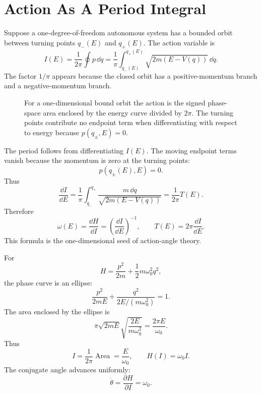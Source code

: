 \section{Action As A Period Integral}
\label{sec:hj-action-period}

Suppose a one-degree-of-freedom autonomous system has a bounded orbit between
turning points \(q_-(E)\) and \(q_+(E)\). The action variable is
\[
  \boxed{
  I(E)=\frac{1}{2\pi}\oint p\,\dd q
  =
  \frac1{\pi}\int_{q_-(E)}^{q_+(E)}
  \sqrt{2m(E-V(q))}\,\dd q.
  }
\]
The factor \(1/\pi\) appears because the closed orbit has a positive-momentum
branch and a negative-momentum branch.

\begin{figure}[htbp]
\centering
{}
\caption{For a one-dimensional bound orbit the action is the signed
phase-space area enclosed by the energy curve divided by \(2\pi\). The turning
points contribute no endpoint term when differentiating with respect to
energy because \(p(q_\pm,E)=0\).}
\label{fig:hj-action-loop}
\end{figure}

The period follows from differentiating \(I(E)\). The moving endpoint terms
vanish because the momentum is zero at the turning points:
\[
  p(q_\pm(E),E)=0.
\]
Thus
\[
  \frac{\dd I}{\dd E}
  =
  \frac1{\pi}\int_{q_-}^{q_+}
  \frac{m\,\dd q}{\sqrt{2m(E-V(q))}}
  =
  \frac1{2\pi}T(E).
\]
Therefore
\[
  \boxed{
  \omega(E)=\frac{\dd H}{\dd I}
  =
  \left(\frac{\dd I}{\dd E}\right)^{-1},
  \qquad
  T(E)=2\pi\frac{\dd I}{\dd E}.
  }
\]
This formula is the one-dimensional seed of action-angle theory.

\begin{example}
For
\[
  H=\frac{p^2}{2m}+\frac12m\omega_0^2q^2,
\]
the phase curve is an ellipse:
\[
  \frac{p^2}{2mE}+\frac{q^2}{2E/(m\omega_0^2)}=1.
\]
The area enclosed by the ellipse is
\[
  \pi\sqrt{2mE}\sqrt{\frac{2E}{m\omega_0^2}}
  =
  \frac{2\pi E}{\omega_0}.
\]
Thus
\[
  I=\frac{1}{2\pi}\operatorname{Area}=\frac{E}{\omega_0},
  \qquad
  H(I)=\omega_0 I.
\]
The conjugate angle advances uniformly:
\[
  \dot\theta=\frac{\partial H}{\partial I}=\omega_0.
\]
\end{example}

